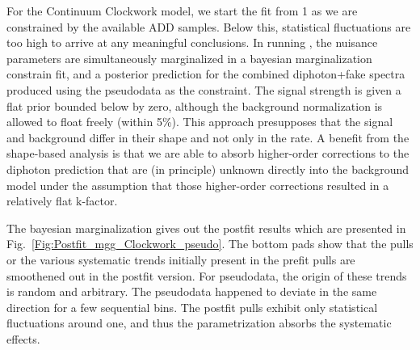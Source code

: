 \begin{spacing}{2}
For the Continuum Clockwork model, we start the fit from 1 \TeV as we are constrained by the available ADD samples. Below this, statistical fluctuations are too high to arrive at any meaningful conclusions. In running \THETA, the nuisance parameters are simultaneously marginalized in a bayesian marginalization constrain fit, and a posterior prediction for the combined diphoton+fake \mgg spectra produced using the pseudodata as the constraint. The signal strength is given a flat prior bounded below by zero, although the background normalization is allowed to float freely (within 5\%). This approach presupposes that the signal and background differ in their shape and not only in the rate. A benefit from the shape-based analysis is that we are able to absorb higher-order corrections to the diphoton prediction that are (in principle) unknown directly into the background model under the assumption that those higher-order corrections resulted in a relatively flat k-factor. 

The bayesian marginalization gives out the postfit results which are presented in Fig.~\ref{Fig:Postfit_mgg_Clockwork_pseudo}. The bottom pads show that the pulls or the various systematic trends initially present in the prefit pulls are smoothened out in the postfit version. For pseudodata, the origin of these trends is random and arbitrary. The pseudodata happened to deviate in the same direction for a few sequential bins. The postfit pulls exhibit only statistical fluctuations around one, and thus the \mgg parametrization absorbs the systematic effects. 

 


\end{spacing}
